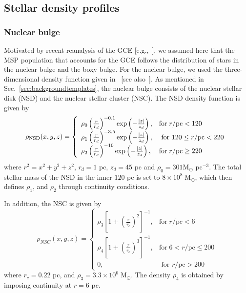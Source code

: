 \documentclass[doublespace,nopageskip]{VTthesis} %
\begin{document}
\begin{appendices}
\chapter{} \label{B}
  \section{Stellar density profiles}
\label{appdx:Stellardensity}

\subsection{Nuclear bulge}
Motivated by recent reanalysis of the GCE [e.g.,~\cite{Macias:2019omb}], we assumed here that the MSP population that accounts for the GCE follows the distribution of stars in the nuclear bulge and the boxy bulge. For the nuclear bulge, we used the three-dimensional density function given in~\cite{Launhardt:2002tx} [see also~\cite{Song:2019nrx}]. As mentioned in Sec.~\ref{sec:backgroundtemplates}, the nuclear bulge consists of the nuclear stellar disk (NSD) and the nuclear stellar cluster (NSC). The NSD density function is given by
\begin{equation}\label{eq:NSD}
\rho_{\rm NSD}(x, y, z)=\left\{\begin{array}{ll}\rho_{0}\left(\frac{r}{r_{d}}\right)^{-0.1} \exp \left(-\frac{|z|}{z_{d}}\right), & \textrm{for}\; r / \mathrm{pc}<120 \\ \rho_{1}\left(\frac{r}{r_{d}}\right)^{-3.5} \exp \left(-\frac{|z|}{z_{d}}\right), & \textrm{ for } 120 \leq r / \mathrm{pc}<220 \\ \rho_{2}\left(\frac{r}{r_{d}}\right)^{-10} \exp \left(-\frac{|z|}{z_{d}}\right), & \textrm{for}\; r / \mathrm{pc} \geq 220 \end{array}\right.    
\end{equation} 
where $r^2=x^2+y^2+z^2$, $r_{d}=1$ pc, $z_{d}=45$ pc and $\rho_{0}=301 \mathrm{M}_{\odot}$ pc$^{-3}$. The total stellar mass of the NSD in the inner $120$ pc is set to $8 \times 10^{8}\;\mathrm{M}_{\odot}$, which then defines $\rho_{1}$, and $\rho_{2}$ through continuity conditions. 

In addition, the NSC is given by
\begin{equation}\label{eq:NSC}
    \rho_{N S C}(x, y, z)=\left\{\begin{array}{ll}\rho_{3}\left[1+\left(\frac{r}{r_{c}}\right)^{2}\right]^{-1}, & \textrm{for}\; r / \mathrm{pc}<6 \\ \rho_{4}\left[1+\left(\frac{r}{r_{c}}\right)^{3}\right]^{-1}, & \textrm{for}\; 6<r / \mathrm{pc} \leq 200 \\ 0, & \text { for } r / \mathrm{pc}>200\end{array}\right.
\end{equation}
where $r_c= 0.22$ pc, and  $\rho_3 = 3.3 \times 10^6 \; \mathrm{M}_{\odot}$. The density $\rho_4$ is obtained by imposing continuity at $r=6$ pc.


\end{appendices}
\end{document}
